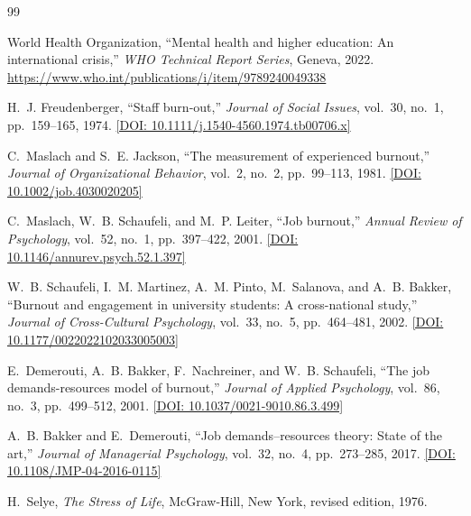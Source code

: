 \documentclass[12pt,a4paper,oneside]{report}
\begin{document}
\begin{thebibliography}{99}

World Health Organization,
\newblock ``Mental health and higher education: An international crisis,''
\newblock \emph{WHO Technical Report Series}, Geneva, 2022. \url{https://www.who.int/publications/i/item/9789240049338}

H.~J. Freudenberger,
\newblock ``Staff burn-out,''
\newblock \emph{Journal of Social Issues}, vol.~30, no.~1, pp.~159--165, 1974. \href{https://doi.org/10.1111/j.1540-4560.1974.tb00706.x}{[DOI: 10.1111/j.1540-4560.1974.tb00706.x]}

C.~Maslach and S.~E. Jackson,
\newblock ``The measurement of experienced burnout,''
\newblock \emph{Journal of Organizational Behavior}, vol.~2, no.~2, pp.~99--113, 1981. \href{https://doi.org/10.1002/job.4030020205}{[DOI: 10.1002/job.4030020205]}

C.~Maslach, W.~B. Schaufeli, and M.~P. Leiter,
\newblock ``Job burnout,''
\newblock \emph{Annual Review of Psychology}, vol.~52, no.~1, pp.~397--422, 2001. \href{https://doi.org/10.1146/annurev.psych.52.1.397}{[DOI: 10.1146/annurev.psych.52.1.397]}

W.~B. Schaufeli, I.~M. Martinez, A.~M. Pinto, M.~Salanova, and A.~B. Bakker,
\newblock ``Burnout and engagement in university students: A cross-national study,''
\newblock \emph{Journal of Cross-Cultural Psychology}, vol.~33, no.~5, pp.~464--481, 2002. \href{https://doi.org/10.1177/0022022102033005003}{[DOI: 10.1177/0022022102033005003]}

E.~Demerouti, A.~B. Bakker, F.~Nachreiner, and W.~B. Schaufeli,
\newblock ``The job demands-resources model of burnout,''
\newblock \emph{Journal of Applied Psychology}, vol.~86, no.~3, pp.~499--512, 2001. \href{https://doi.org/10.1037/0021-9010.86.3.499}{[DOI: 10.1037/0021-9010.86.3.499]}

A.~B. Bakker and E.~Demerouti,
\newblock ``Job demands--resources theory: State of the art,''
\newblock \emph{Journal of Managerial Psychology}, vol.~32, no.~4, pp.~273--285, 2017. \href{https://doi.org/10.1108/JMP-04-2016-0115}{[DOI: 10.1108/JMP-04-2016-0115]}

H.~Selye,
\newblock \emph{The Stress of Life},
\newblock McGraw-Hill, New York, revised edition, 1976.


\end{thebibliography}
\end{document}
